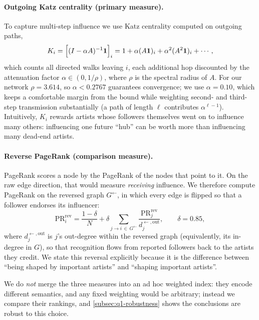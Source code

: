 \paragraph{Outgoing Katz centrality (primary measure).}
To capture multi-step influence we use Katz centrality computed on outgoing
paths,
\begin{equation}\label{eq:katz}
K_i=\Bigl[(I-\alpha A)^{-1}\mathbf{1}\Bigr]_i
   =1+\alpha (A\mathbf{1})_i+\alpha^2(A^2\mathbf{1})_i+\cdots,
\end{equation}
which counts all directed walks leaving \(i\), each additional hop discounted
by the attenuation factor \(\alpha\in(0,1/\rho)\), where \(\rho\) is the
spectral radius of \(A\). For our network \(\rho=3.614\), so
\(\alpha<0.2767\) guarantees convergence; we use \(\alpha=0.10\), which keeps
a comfortable margin from the bound while weighting second- and third-step
transmission substantially (a path of length \(\ell\) contributes
\(\alpha^{\ell-1}\)). Intuitively, \(K_i\) rewards artists whose followers
themselves went on to influence many others: influencing one future
``hub'' can be worth more than influencing many dead-end artists.

\paragraph{Reverse PageRank (comparison measure).}
PageRank scores a node by the PageRank of the nodes that point to it. On the
raw edge direction, that would measure \emph{receiving} influence. We therefore
compute PageRank on the reversed graph \(G^{\leftarrow}\), in which every edge
is flipped so that a follower endorses its influencer:
\begin{equation}\label{eq:rpr}
\mathrm{PR}^{\text{rev}}_i=\frac{1-\delta}{N}
 +\delta\sum_{j\to i\,\in\,G^{\leftarrow}}\frac{\mathrm{PR}^{\text{rev}}_j}{d_j^{\leftarrow,\text{out}}},
 \qquad \delta=0.85,
\end{equation}
where \(d_j^{\leftarrow,\text{out}}\) is \(j\)'s out-degree within the
reversed graph (equivalently, its in-degree in \(G\)), so that recognition
flows from reported followers back to the artists they credit. We state
this reversal explicitly because it is the difference between
``being shaped by important artists'' and ``shaping important artists''.

We do \emph{not} merge the three measures into an ad hoc weighted index:
they encode different semantics, and any fixed weighting would be
arbitrary; instead we compare their rankings, and
\cref{subsec:q1-robustness} shows the conclusions are robust to this
choice.

